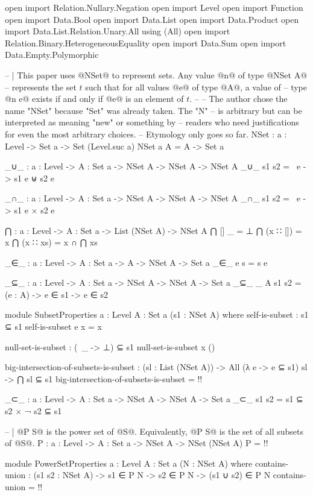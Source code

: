 \begin{code}
open import Relation.Nullary.Negation
open import Level
open import Function
open import Data.Bool
open import Data.List
open import Data.Product
open import Data.List.Relation.Unary.All using (All)
open import Relation.Binary.HeterogeneousEquality
open import Data.Sum
open import Data.Empty.Polymorphic

-- | This paper uses @NSet@ to represent sets.  Any value @n@ of type @NSet A@
-- represents the set \(t\) such that for all values @e@ of type @A@, a value of
-- type @n e@ exists if and only if @e@ is an element of \(t\).
--
-- The author chose the name "NSet" because "Set" was already taken.  The "N"
-- is arbitrary but can be interpreted as meaning "new" or something by
-- readers who need justifications for even the most arbitrary choices.
-- Etymology only goes so far.
NSet : {a : Level} -> Set a -> Set (Level.suc a)
NSet {a} A = A -> Set a

_∪_ : {a : Level} -> {A : Set a} -> NSet A -> NSet A -> NSet A
_∪_ s1 s2 = \ e -> s1 e ⊎ s2 e

_∩_ : {a : Level} -> {A : Set a} -> NSet A -> NSet A -> NSet A
_∩_ s1 s2 = \ e -> s1 e × s2 e

⋂ : {a : Level} -> {A : Set a} -> List (NSet A) -> NSet A
⋂ [] _ = ⊥
⋂ (x ∷ []) = x
⋂ (x ∷ xs) = x ∩ ⋂ xs

_∈_ : {a : Level} -> {A : Set a} -> A -> NSet A -> Set a
_∈_ e s = s e

_⊆_ : {a : Level} -> {A : Set a} -> NSet A -> NSet A -> Set a
_⊆_ {_} {A} s1 s2 = (e : A) -> e ∈ s1 -> e ∈ s2

module SubsetProperties {a : Level} {A : Set a} (s1 : NSet A) where
  self-is-subset : s1 ⊆ s1
  self-is-subset e x = x

  null-set-is-subset : (\ _ -> ⊥) ⊆ s1
  null-set-is-subset x ()

  big-intersection-of-subsets-is-subset :
    (sl : List (NSet A)) ->
    All (λ e -> e ⊆ s1) sl ->
    ⋂ sl ⊆ s1
  big-intersection-of-subsets-is-subset = {!!}

_⊂_ : {a : Level} -> {A : Set a} -> NSet A -> NSet A -> Set a
_⊂_ s1 s2 = s1 ⊆ s2 × ¬ s2 ⊆ s1

-- | @P S@ is the power set of @S@.  Equivalently, @P S@ is the set of all subsets of @S@.
P : {a : Level} -> {A : Set a} -> NSet A -> NSet (NSet A)
P = {!!}

module PowerSetProperties {a : Level} {A : Set a} (N : NSet A) where
  contains-union : (s1 s2 : NSet A) -> s1 ∈ P N -> s2 ∈ P N -> (s1 ∪ s2) ∈ P N
  contains-union = {!!}


\end{code}
